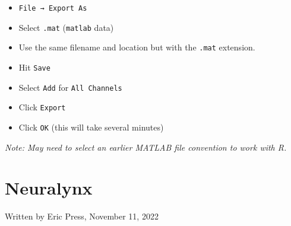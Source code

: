 \documentclass[
]{book}
\providecommand{\tightlist}{%
  \setlength{\itemsep}{0pt}\setlength{\parskip}{0pt}}
\begin{document}
\begin{enumerate}
  \begin{itemize}
  \tightlist
  \item
    \texttt{File\ →\ Export\ As}
  \item
    Select \texttt{.mat} (\texttt{matlab} data)
  \item
    Use the same filename and location but with the \texttt{.mat}
    extension.
  \item
    Hit \texttt{Save}
  \item
    Select \texttt{Add} for \texttt{All\ Channels}
  \item
    Click \texttt{Export}
  \item
    Click \texttt{OK} (this will take several minutes)
  \end{itemize}
\end{enumerate}

\emph{Note: May need to select an earlier MATLAB file convention to work with R.}

\hypertarget{neuralynx}{%
\section{Neuralynx}\label{neuralynx}}

Written by Eric Press, November 11, 2022
\end{document}
